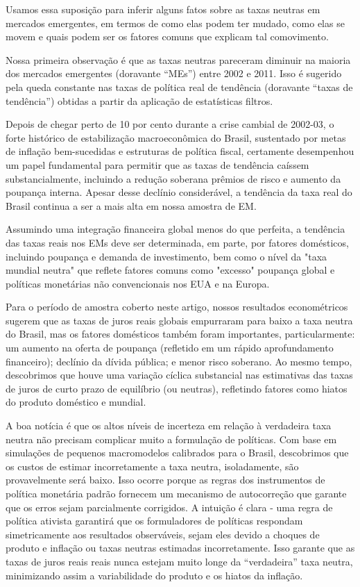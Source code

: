 Usamos essa suposição para inferir alguns fatos sobre as taxas neutras em mercados emergentes, em termos de como elas podem ter mudado, como elas se movem e quais podem ser os fatores comuns que explicam tal comovimento. 

Nossa primeira observação é que as taxas neutras pareceram diminuir na maioria dos mercados emergentes (doravante “MEs”) entre 2002 e 2011. Isso é sugerido pela queda constante nas taxas de política real de tendência (doravante “taxas de tendência”) obtidas a partir da aplicação de estatísticas filtros.

Depois de chegar perto de 10 por cento durante a crise cambial de 2002-03, o forte histórico de estabilização macroeconômica do Brasil, sustentado por metas de inflação bem-sucedidas e estruturas de política fiscal, certamente desempenhou um papel fundamental para permitir que as taxas de tendência caíssem substancialmente, incluindo a redução soberana prêmios de risco e aumento da poupança interna. Apesar desse declínio considerável, a tendência da taxa real do Brasil continua a ser a mais alta em nossa amostra de EM.

Assumindo uma integração financeira global menos do que perfeita, a tendência das taxas reais nos EMs deve ser determinada, em parte, por fatores domésticos, incluindo poupança e demanda de investimento, bem como o nível da "taxa mundial neutra" que reflete fatores comuns como "excesso" poupança global e políticas monetárias não convencionais nos EUA e na Europa.

Para o período de amostra coberto neste artigo, nossos resultados econométricos sugerem que as taxas de juros reais globais empurraram para baixo a taxa neutra do Brasil, mas os fatores domésticos também foram importantes, particularmente: um aumento na oferta de poupança (refletido em um rápido aprofundamento financeiro); declínio da dívida pública; e menor risco soberano. Ao mesmo tempo, descobrimos que houve uma variação cíclica substancial nas estimativas das taxas de juros de curto prazo de equilíbrio (ou neutras), refletindo fatores como hiatos do produto doméstico e mundial.

A boa notícia é que os altos níveis de incerteza em relação à verdadeira taxa neutra não precisam complicar muito a formulação de políticas. Com base em simulações de pequenos macromodelos calibrados para o Brasil, descobrimos que os custos de estimar incorretamente a taxa neutra, isoladamente, são
provavelmente será baixo. Isso ocorre porque as regras dos instrumentos de política monetária padrão fornecem um mecanismo de autocorreção que garante que os erros sejam parcialmente corrigidos. A intuição é clara - uma regra de política ativista garantirá que os formuladores de políticas respondam simetricamente aos resultados observáveis, sejam eles devido a choques de produto e inflação ou taxas neutras estimadas incorretamente. Isso garante que as taxas de juros reais reais nunca estejam muito longe da “verdadeira” taxa neutra, minimizando assim a variabilidade do produto e os hiatos da inflação.
%
%

